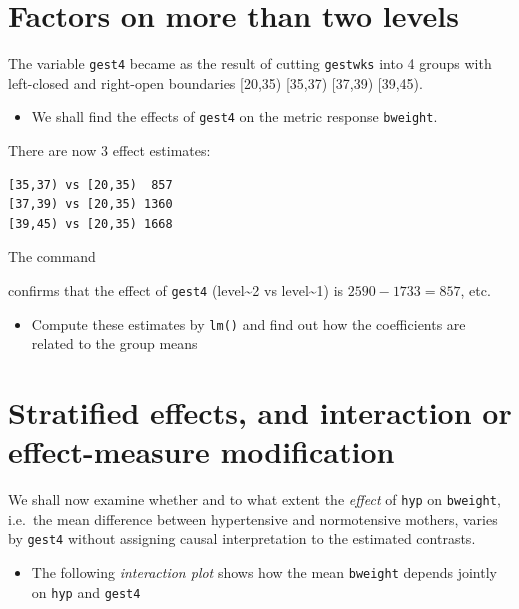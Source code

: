 \documentclass[
]{book}
\providecommand{\tightlist}{%
  \setlength{\itemsep}{0pt}\setlength{\parskip}{0pt}}
\begin{document}
\section{Factors on more than two levels}\label{factors-on-more-than-two-levels}

The variable \texttt{gest4} became as the result of cutting \texttt{gestwks}
into 4 groups with left-closed and right-open boundaries {[}20,35) {[}35,37) {[}37,39) {[}39,45).

\begin{itemize}
\tightlist
\item
  We shall find the effects of \texttt{gest4} on the metric response \texttt{bweight}.
\end{itemize}

There are now 3 effect estimates:

\begin{verbatim}
[35,37) vs [20,35)  857
[37,39) vs [20,35) 1360
[39,45) vs [20,35) 1668
\end{verbatim}

The command

confirms that the effect of \texttt{gest4} (level\textasciitilde2 vs level\textasciitilde1) is \(2590-1733=857\), etc.

\begin{itemize}
\tightlist
\item
  Compute these estimates by \texttt{lm()} and find out how the coefficients are related to the group means
\end{itemize}

\section{Stratified effects, and interaction or effect-measure modification}\label{stratified-effects-and-interaction-or-effect-measure-modification}

We shall now examine whether and to what extent the
\emph{effect} of \texttt{hyp} on \texttt{bweight}, i.e.~the
mean difference between hypertensive and normotensive mothers,
varies by \texttt{gest4} without assigning
causal interpretation to the estimated contrasts.

\begin{itemize}
\tightlist
\item
  The following \emph{interaction plot}
  shows how the mean \texttt{bweight} depends jointly on \texttt{hyp} and \texttt{gest4}
\end{itemize}
\end{document}
